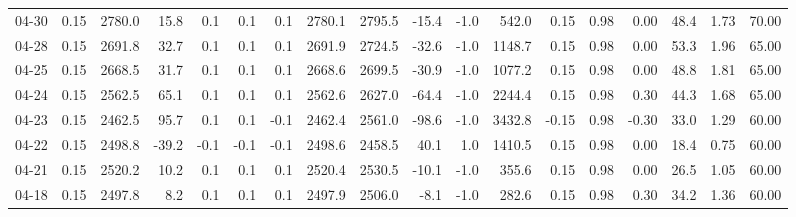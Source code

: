 \begin{threeparttable}
{\begin{tabular}{lrrrrrrrrrrrrrrrrr}
  04-30 &     0.15 & 2780.0 &              15.8 &               0.1 &                0.1 &                0.1 & 2780.1 & 2795.5 &      -15.4 &                     -1.0 &               542.0 &       0.15 &      0.98 &           0.00 &             48.4 &            1.73 &                  70.00 \\
  04-28 &     0.15 & 2691.8 &              32.7 &               0.1 &                0.1 &                0.1 & 2691.9 & 2724.5 &      -32.6 &                     -1.0 &              1148.7 &       0.15 &      0.98 &           0.00 &             53.3 &            1.96 &                  65.00 \\
  04-25 &     0.15 & 2668.5 &              31.7 &               0.1 &                0.1 &                0.1 & 2668.6 & 2699.5 &      -30.9 &                     -1.0 &              1077.2 &       0.15 &      0.98 &           0.00 &             48.8 &            1.81 &                  65.00 \\
  04-24 &     0.15 & 2562.5 &              65.1 &               0.1 &                0.1 &                0.1 & 2562.6 & 2627.0 &      -64.4 &                     -1.0 &              2244.4 &       0.15 &      0.98 &           0.30 &             44.3 &            1.68 &                  65.00 \\
  04-23 &     0.15 & 2462.5 &              95.7 &               0.1 &                0.1 &               -0.1 & 2462.4 & 2561.0 &      -98.6 &                     -1.0 &              3432.8 &      -0.15 &      0.98 &          -0.30 &             33.0 &            1.29 &                  60.00 \\
  04-22 &     0.15 & 2498.8 &             -39.2 &              -0.1 &               -0.1 &               -0.1 & 2498.6 & 2458.5 &       40.1 &                      1.0 &              1410.5 &       0.15 &      0.98 &           0.00 &             18.4 &            0.75 &                  60.00 \\
  04-21 &     0.15 & 2520.2 &              10.2 &               0.1 &                0.1 &                0.1 & 2520.4 & 2530.5 &      -10.1 &                     -1.0 &               355.6 &       0.15 &      0.98 &           0.00 &             26.5 &            1.05 &                  60.00 \\
  04-18 &     0.15 & 2497.8 &               8.2 &               0.1 &                0.1 &                0.1 & 2497.9 & 2506.0 &       -8.1 &                     -1.0 &               282.6 &       0.15 &      0.98 &           0.30 &             34.2 &            1.36 &                  60.00 \\

\end{tabular}}
\end{threeparttable}
